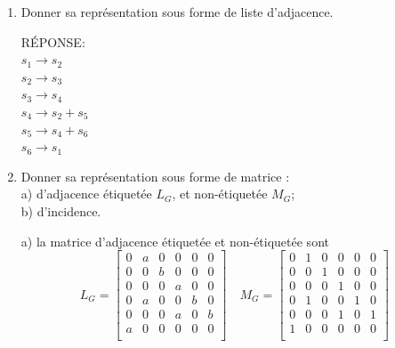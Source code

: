 \begin{enumerate}[\rm 1)]
\item{} Donner sa repr\'esentation sous forme de liste d'adjacence. 
\begin{framed}

RÉPONSE:\\
$s_1 \xrightarrow{}s_2$\\
$s_2 \xrightarrow{}s_3$\\
$s_3 \xrightarrow{}s_4$\\
$s_4 \xrightarrow{}s_2 + s_5$\\
$s_5 \xrightarrow{}s_4 + s_6$\\
$s_6 \xrightarrow{}s_1$\\

\end{framed}
\item {} Donner sa repr\'esentation sous forme de matrice :\\
 \quad a) d'adjacence \'etiquet\'ee $L_G$, et non-\'etiquet\'ee $M_G$;  \\
 \quad b) d'incidence. 

\begin{framed}
a) la matrice d'adjacence \'etiquet\'ee et non-\'etiquet\'ee sont 
\[ L_G= 
 \begin{bmatrix}
 0&a &0&0&0&0\\
 0&0 &b&0&0&0\\
 0&0 &0&a&0&0\\
 0&a &0&0&b&0\\
 0&0 &0&a&0&b\\
 a&0 &0&0&0&0\\
\end{bmatrix}
\quad M_G= 
\begin{bmatrix}
 0&1 &0&0&0&0\\
 0&0 &1&0&0&0\\
 0&0 &0&1&0&0\\
 0&1 &0&0&1&0\\
 0&0 &0&1&0&1\\
 1&0 &0&0&0&0\\
\end{bmatrix}
\]


\end{framed}
\end{enumerate}
